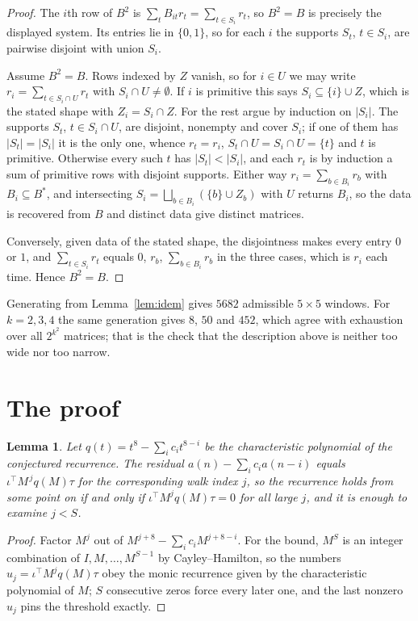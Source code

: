 \documentclass[11pt,a4paper]{article}
\theoremstyle{plain}
\newtheorem{lemma}[theorem]{Lemma}
\theoremstyle{definition}
\begin{document}
\begin{proof}
The $i$th row of $B^2$ is $\sum_t B_{it}r_t=\sum_{t\in S_i}r_t$, so $B^2=B$ is precisely the
displayed system. Its entries lie in $\{0,1\}$, so for each $i$ the supports $S_t$,
$t\in S_i$, are pairwise disjoint with union $S_i$.

Assume $B^2=B$. Rows indexed by $Z$ vanish, so for $i\in U$ we may write
$r_i=\sum_{t\in S_i\cap U}r_t$ with $S_i\cap U\neq\emptyset$. If $i$ is primitive this says
$S_i\subseteq\{i\}\cup Z$, which is the stated shape with $Z_i=S_i\cap Z$. For the rest argue
by induction on $|S_i|$. The supports $S_t$, $t\in S_i\cap U$, are disjoint, nonempty and
cover $S_i$; if one of them has $|S_t|=|S_i|$ it is the only one, whence $r_t=r_i$,
$S_t\cap U=S_i\cap U=\{t\}$ and $t$ is primitive. Otherwise every such $t$ has
$|S_t|<|S_i|$, and each $r_t$ is by induction a sum of primitive rows with disjoint supports.
Either way $r_i=\sum_{b\in B_i}r_b$ with $B_i\subseteq B^{\ast}$, and intersecting
$S_i=\bigsqcup_{b\in B_i}(\{b\}\cup Z_b)$ with $U$ returns $B_i$, so the data is recovered
from $B$ and distinct data give distinct matrices.

Conversely, given data of the stated shape, the disjointness makes every entry $0$ or $1$, and
$\sum_{t\in S_i}r_t$ equals $0$, $r_b$, $\sum_{b\in B_i}r_b$ in the three cases, which is
$r_i$ each time. Hence $B^2=B$.
\end{proof}

Generating from Lemma~\ref{lem:idem} gives $5682$ admissible $5\times5$ windows. For
$k=2,3,4$ the same generation gives $8$, $50$ and $452$, which agree with exhaustion over all
$2^{k^2}$ matrices; that is the check that the description above is neither too wide nor too
narrow.

\section{The proof}

\begin{lemma}\label{lem:crit}
Let $q(t)=t^{8}-\sum_i c_it^{8-i}$ be the characteristic polynomial of the
conjectured recurrence. The residual $a(n)-\sum_ic_ia(n-i)$ equals
$\iota^{\!\top}M^{\,j}q(M)\tau$ for the corresponding walk index $j$, so the recurrence
holds from some point on if and only if $\iota^{\!\top}M^{j}q(M)\tau=0$ for all large $j$,
and it is enough to examine $j<S$.
\end{lemma}

\begin{proof}
Factor $M^{j}$ out of $M^{j+8}-\sum_ic_iM^{j+8-i}$. For the bound, $M^{S}$
is an integer combination of $I,M,\dots,M^{S-1}$ by Cayley--Hamilton, so the numbers
$u_j=\iota^{\!\top}M^{j}q(M)\tau$ obey the monic recurrence given by the characteristic
polynomial of $M$; $S$ consecutive zeros force every later one, and the last nonzero $u_j$
pins the threshold exactly.
\end{proof}
\end{document}

